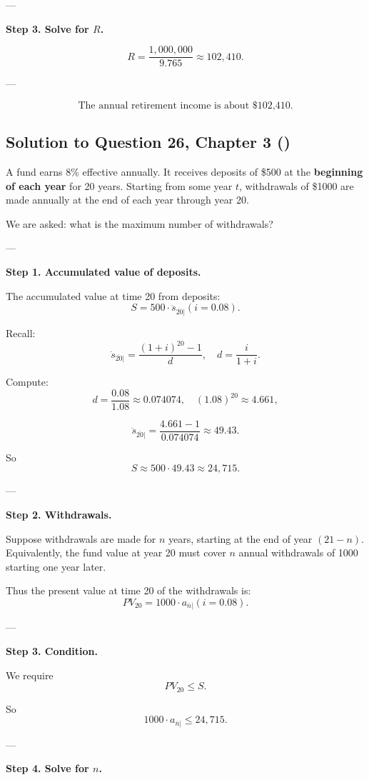 \documentclass[12pt, a4paper]{article}
\begin{document}
{---

\textbf{Step 3. Solve for $R$.}

\[
R = \frac{1{,}000{,}000}{9.765} \approx 102,410.
\]

---

\[
\boxed{\text{The annual retirement income is about \$102,410.}}
\]

\subsection*{Solution to Question 26, Chapter 3 (\cite{toi3rd})}

A fund earns 8\% effective annually.  
It receives deposits of \$500 at the \textbf{beginning of each year} for 20 years.  
Starting from some year $t$, withdrawals of \$1000 are made annually at the end of each year through year 20.

We are asked: what is the maximum number of withdrawals?

---

\textbf{Step 1. Accumulated value of deposits.}

The accumulated value at time 20 from deposits:
\[
S = 500 \cdot \ddot{s}_{\overline{20}|}(i=0.08).
\]

Recall:
\[
\ddot{s}_{\overline{20}|} = \frac{(1+i)^{20}-1}{d}, 
\quad d=\frac{i}{1+i}.
\]

Compute:
\[
d = \frac{0.08}{1.08} \approx 0.074074,
\quad (1.08)^{20} \approx 4.661,
\]

\[
\ddot{s}_{\overline{20}|} = \frac{4.661-1}{0.074074} \approx 49.43.
\]

So
\[
S \approx 500 \cdot 49.43 \approx 24,715.
\]

---

\textbf{Step 2. Withdrawals.}

Suppose withdrawals are made for $n$ years, starting at the end of year $(21-n)$.  
Equivalently, the fund value at year 20 must cover $n$ annual withdrawals of 1000 starting one year later.

Thus the present value at time 20 of the withdrawals is:
\[
PV_{20} = 1000 \cdot a_{\overline{n}|}(i=0.08).
\]

---

\textbf{Step 3. Condition.}

We require
\[
PV_{20} \leq S.
\]

So
\[
1000 \cdot a_{\overline{n}|} \leq 24,715.
\]

---

\textbf{Step 4. Solve for $n$.}

}
\end{document}
